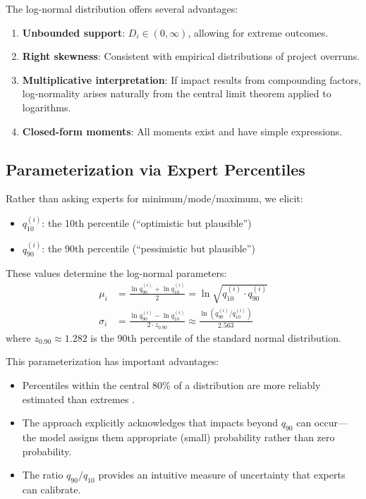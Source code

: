 \documentclass[12pt,a4paper]{article}
\theoremstyle{definition}
\theoremstyle{remark}
\begin{document}
The log-normal distribution offers several advantages:
\begin{enumerate}
    \item \textbf{Unbounded support}: $D_i \in (0, \infty)$, allowing for extreme outcomes.
    \item \textbf{Right skewness}: Consistent with empirical distributions of project overruns.
    \item \textbf{Multiplicative interpretation}: If impact results from compounding factors, log-normality arises naturally from the central limit theorem applied to logarithms.
    \item \textbf{Closed-form moments}: All moments exist and have simple expressions.
\end{enumerate}

\subsection{Parameterization via Expert Percentiles}

Rather than asking experts for minimum/mode/maximum, we elicit:
\begin{itemize}
    \item $q_{10}^{(i)}$: the 10th percentile (``optimistic but plausible'')
    \item $q_{90}^{(i)}$: the 90th percentile (``pessimistic but plausible'')
\end{itemize}

These values determine the log-normal parameters:
\begin{align}
    \mu_i &= \frac{\ln q_{90}^{(i)} + \ln q_{10}^{(i)}}{2} = \ln \sqrt{q_{10}^{(i)} \cdot q_{90}^{(i)}} \\
    \sigma_i &= \frac{\ln q_{90}^{(i)} - \ln q_{10}^{(i)}}{2 \cdot z_{0.90}} \approx \frac{\ln(q_{90}^{(i)} / q_{10}^{(i)})}{2.563}
\end{align}
where $z_{0.90} \approx 1.282$ is the 90th percentile of the standard normal distribution.

This parameterization has important advantages:
\begin{itemize}
    \item Percentiles within the central 80\% of a distribution are more reliably estimated than extremes \citep{OHagan2006}.
    \item The approach explicitly acknowledges that impacts beyond $q_{90}$ can occur—the model assigns them appropriate (small) probability rather than zero probability.
    \item The ratio $q_{90}/q_{10}$ provides an intuitive measure of uncertainty that experts can calibrate.
\end{itemize}
\end{document}
